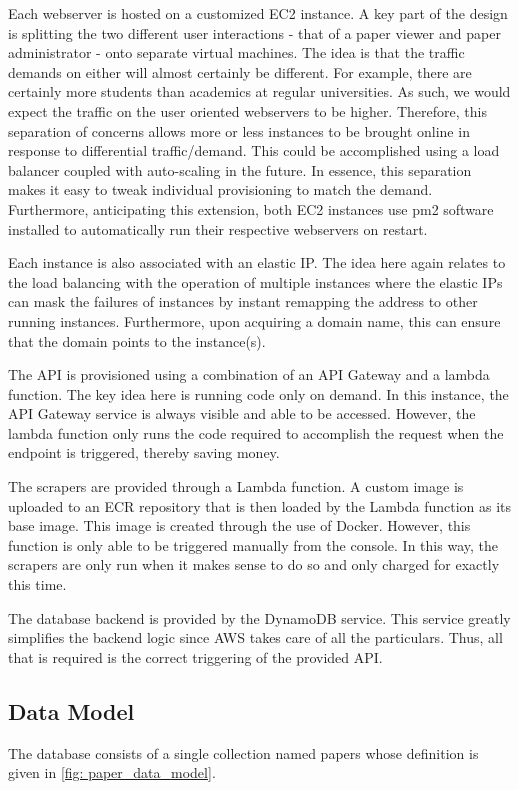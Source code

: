 \documentclass[12pt]{article}
\begin{document}
Each webserver is hosted on a customized EC2 instance. A key part of the design is splitting the two different user interactions - that of a paper viewer and paper administrator - onto separate virtual machines. The idea is that the traffic demands on either will almost certainly be different. For example, there are certainly more students than academics at regular universities. As such, we would expect the traffic on the user oriented webservers to be higher. Therefore, this separation of concerns allows more or less instances to be brought online in response to differential traffic/demand. This could be accomplished using a load balancer coupled with auto-scaling in the future. In essence, this separation makes it easy to tweak individual provisioning to match the demand. 
Furthermore, anticipating this extension, both EC2 instances use pm2 software installed to automatically run their respective webservers on restart. 

Each instance is also associated with an elastic IP. The idea here again relates to the load balancing with the operation of multiple instances where the elastic IPs can mask the failures of instances by instant remapping the address to other running instances. Furthermore, upon acquiring a domain name, this can ensure that the domain points to the instance(s).

The API is provisioned using a combination of an API Gateway and a lambda function. The key idea here is running code only on demand. In this instance, the API Gateway service is always visible and able to be accessed. However, the lambda function only runs the code required to accomplish the request when the endpoint is triggered, thereby saving money.   

The scrapers are provided through a Lambda function. A custom image is uploaded to an ECR repository that is then loaded by the Lambda function as its base image. This image is created through the use of Docker. However, this function is only able to be triggered manually from the console. In this way, the scrapers are only run when it makes sense to do so and only charged for exactly this time.

The database backend is provided by the DynamoDB service. This service greatly simplifies the backend logic since AWS takes care of all the particulars. Thus, all that is required is the correct triggering of the provided API. 

\subsection{Data Model}
The database consists of a single collection named papers whose definition is given in \ref{fig: paper_data_model}.
\end{document}
